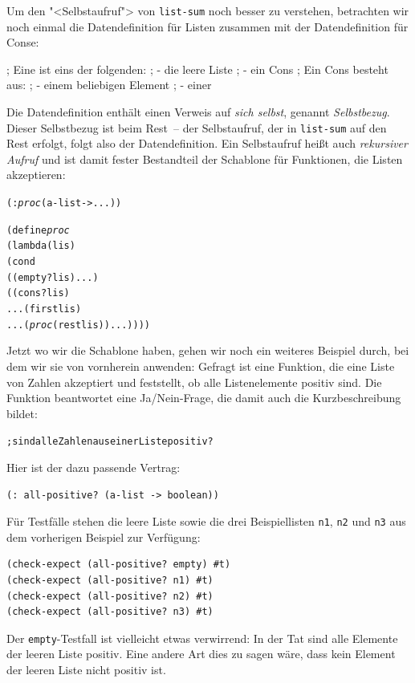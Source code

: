 Um den "<Selbstaufruf"> von \texttt{list-sum} noch besser zu
verstehen, betrachten wir noch einmal die Datendefinition für
Listen zusammen mit der Datendefinition für Conse:

\begin{pspdf}
\begin{ttfamily}\obeylines
; Eine  ist eins der folgenden:
; - die leere Liste
; - ein Cons
; Ein Cons besteht aus:
; - einem beliebigen Element
; - einer 
\end{ttfamily}
\end{pspdf}

Die Datendefinition enthält einen Verweis auf \emph{sich selbst},
genannt \emph{Selbstbezug}.  Dieser Selbstbezug ist
beim Rest~-- der Selbstaufruf, der in \texttt{list-sum} auf den Rest
erfolgt, folgt also der Datendefinition.  Ein Selbstaufruf
heißt auch \textit{rekursiver Aufruf} und ist
damit fester Bestandteil der Schablone für Funktionen, die Listen
akzeptieren:
%
\begin{alltt}
(: \textit{proc} (a-list -> ...))

(define \textit{proc}
  (lambda (lis)
    (cond
      ((empty? lis) ...)
      ((cons? lis)
       ... (first lis)
       ... (\textit{proc} (rest lis)) ...))))
\end{alltt}
%
Jetzt wo wir die Schablone haben, gehen wir noch ein weiteres Beispiel
durch, bei dem wir sie von vornherein anwenden:  Gefragt ist eine
Funktion, die eine Liste von Zahlen akzeptiert und feststellt, ob alle
Listenelemente  positiv sind.  Die Funktion beantwortet eine
Ja/Nein-Frage, die damit auch die Kurzbeschreibung bildet:
%
\begin{alltt}
; sind alle Zahlen aus einer Liste positiv?
\end{alltt}
%
Hier ist der dazu passende Vertrag:
%
\begin{verbatim}
(: all-positive? (a-list -> boolean))
\end{verbatim}
%
Für Testfälle stehen die leere Liste sowie die drei Beispiellisten
\texttt{n1}, \texttt{n2} und \texttt{n3} aus dem vorherigen Beispiel
zur Verfügung:
%
\begin{verbatim}
(check-expect (all-positive? empty) #t)
(check-expect (all-positive? n1) #t)
(check-expect (all-positive? n2) #t)
(check-expect (all-positive? n3) #t)
\end{verbatim}
%
Der \texttt{empty}-Testfall ist vielleicht etwas verwirrend: In der
Tat sind alle Elemente der leeren Liste positiv.  Eine andere Art dies
zu sagen wäre, dass kein Element der leeren Liste nicht positiv ist.

